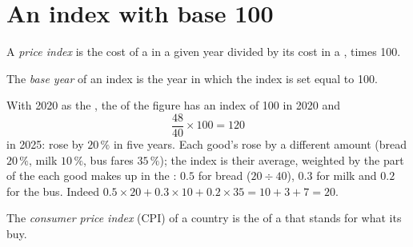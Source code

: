 \section{An index with base 100}

\begin{definition}\label{def:g8:inflation-and-price-indices:price-index}
A \emph{price index} is the cost of a  in a given year divided by its
cost in a , times 100.
\end{definition}

\begin{definition}\label{def:g8:inflation-and-price-indices:base-year}
The \emph{base year} of an index is the year in which the index is set equal to
100.
\end{definition}

With 2020 as the , the  of the figure has an index of 100 in 2020 and
\[
\frac{48}{40} \times 100 = 120
\]
in 2025:  rose by $20\,\%$ in five years. Each good's  rose by a different amount
(bread $20\,\%$, milk $10\,\%$, bus fares $35\,\%$); the index is their average, weighted by the
part of the  each good makes up in the : $0.5$ for bread ($20 \div 40$), $0.3$ for
milk and $0.2$ for the bus. Indeed $0.5 \times 20 + 0.3 \times 10 + 0.2 \times 35 = 10 + 3 + 7 =
20$.

\begin{definition}\label{def:g8:inflation-and-price-indices:cpi}
The \emph{consumer price index} (CPI) of a country is the 
of a  that stands for what its  buy.
\end{definition}

